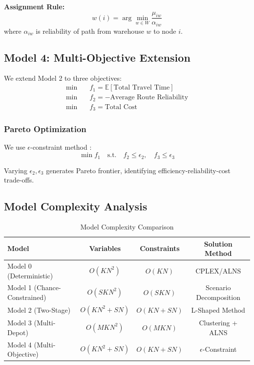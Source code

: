 \textbf{Assignment Rule:}
\begin{equation}
w(i) = \arg\min_{w \in W} \frac{\mu_{iw}}{\alpha_{iw}}
\end{equation}
where $\alpha_{iw}$ is reliability of path from warehouse $w$ to node $i$.

\subsection{Model 4: Multi-Objective Extension}

We extend Model 2 to three objectives:
\begin{align}
\min \quad & f_1 = \mathbb{E}[\text{Total Travel Time}] \\
\min \quad & f_2 = -\text{Average Route Reliability} \\
\min \quad & f_3 = \text{Total Cost}
\end{align}

\subsubsection{Pareto Optimization}

We use $\epsilon$-constraint method \cite{Haimes1971}:
\begin{equation}
\min f_1 \quad \text{s.t.} \quad f_2 \leq \epsilon_2, \quad f_3 \leq \epsilon_3
\end{equation}

Varying $\epsilon_2, \epsilon_3$ generates Pareto frontier, identifying efficiency-reliability-cost trade-offs.

\subsection{Model Complexity Analysis}

\begin{table}[H]
\centering
\caption{Model Complexity Comparison}
\begin{tabular}{lccc}
\toprule
Model & Variables & Constraints & Solution Method \\
\midrule
Model 0 (Deterministic) & $O(KN^2)$ & $O(KN)$ & CPLEX/ALNS \\
Model 1 (Chance-Constrained) & $O(SKN^2)$ & $O(SKN)$ & Scenario Decomposition \\
Model 2 (Two-Stage) & $O(KN^2 + SN)$ & $O(KN + SN)$ & L-Shaped Method \\
Model 3 (Multi-Depot) & $O(MKN^2)$ & $O(MKN)$ & Clustering + ALNS \\
Model 4 (Multi-Objective) & $O(KN^2 + SN)$ & $O(KN + SN)$ & $\epsilon$-Constraint \\
\bottomrule
\end{tabular}
\end{table}

